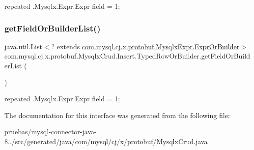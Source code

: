 {\ttfamily repeated .Mysqlx.\+Expr.\+Expr field = 1;} \mbox{\label{interfacecom_1_1mysql_1_1cj_1_1x_1_1protobuf_1_1_mysqlx_crud_1_1_insert_1_1_typed_row_or_builder_a0d0b9398d7b4753031f6af74f37e22d6}} 
\subsubsection{\texorpdfstring{get\+Field\+Or\+Builder\+List()}{getFieldOrBuilderList()}}
{\footnotesize\ttfamily java.\+util.\+List$<$? extends \mbox{\hyperlink{interfacecom_1_1mysql_1_1cj_1_1x_1_1protobuf_1_1_mysqlx_expr_1_1_expr_or_builder}{com.\+mysql.\+cj.\+x.\+protobuf.\+Mysqlx\+Expr.\+Expr\+Or\+Builder}}$>$ com.\+mysql.\+cj.\+x.\+protobuf.\+Mysqlx\+Crud.\+Insert.\+Typed\+Row\+Or\+Builder.\+get\+Field\+Or\+Builder\+List (\begin{DoxyParamCaption}{ }\end{DoxyParamCaption})}

{\ttfamily repeated .Mysqlx.\+Expr.\+Expr field = 1;} 

The documentation for this interface was generated from the following file\+:\begin{DoxyCompactItemize}
\item 
pruebas/mysql-\/connector-\/java-\/8../src/generated/java/com/mysql/cj/x/protobuf/Mysqlx\+Crud.\+java\end{DoxyCompactItemize}
